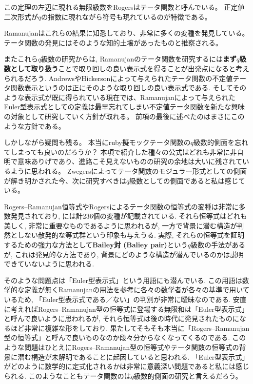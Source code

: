 \documentclass[11pt,b5paper,oneside,lualatex]{ltjsarticle} %
\numberwithin{equation}{section} %
\begin{document}
この定理の左辺に現れる無限級数をRogersはテータ関数と呼んでいる。
正定値二次形式が$ q $の指数に現れながら符号も現れているのが特徴である。

Ramanujanはこれらの結果に知悉しており、非常に多くの変種を発見している。
テータ関数の発見にはそのような知的土壌があったものと推察される。

またこれら$ q $級数の研究からは, Ramanujanのテータ関数を研究するには\textbf{まず$ q $級数として取り扱う}ことで取り回しの良い表示式を得ることが出発点になると考えられるだろう. 
AndrewsやHickersonによって与えられたテータ関数の不定値テータ関数表示というのは正にそのような取り回しの良い表示式である. 
そしてそのような表示式が既に得られている現在では、Ramanujanによって与えられたEuler型表示式としての定義は最早忘れてしまい不定値テータ関数を新たな興味の対象として研究していく方針が取れる。
前項の最後に述べたのはまさにこのような方針である。

しかしながら疑問も残る。
本当にruby{擬}{モック}テータ関数の$ q $級数的側面を忘れてしまっても良いのだろうか？
本項で紹介した種々の公式はどれも非常に非自明で意味ありげであり、進路こそ見えないものの研究の余地は大いに残されているように思われる。
Zwegersによってテータ関数のモジュラー形式としての側面が解き明かされた今、次に研究すべきは$ q $級数としての側面であると私は感じている。

\begin{rem}
	Rogers--Ramanujan恒等式やRogersによるテータ関数の恒等式の変種は非常に多数発見されており, \cite[付録A]{魅惑}には計236個の変種が記載されている. 
	それら恒等式はどれも美しく, 非常に重要なものであるように思われるが, 一方で背景に潜む構造が判然としない散発的な等式群という印象も与えうる. 
	実際, それらの恒等式を証明するための強力な方法として\textbf{Bailey対 (Baliey pair)}という$ q $級数の手法があるが, これは発見的な方法であり, 背景にどのような構造が潜んでいるのかは説明できていないように思われる. 
	
	そのような問題点は「Euler型表示式」という用語にも潜んでいる. 
	この用語は数学的な定義が無くRamanujanの用法を参考に各々の数学者が各々の基準で用いているため, 「Euler型表示式である／ない」の判別が非常に曖昧なのである. 
	安直に考えればRogers--Ramanujan型の恒等式に登場する無限和は「Euler型表示式」と呼んで良いように思われるが, それら恒等式は後の時代に発見されたものになるほど非常に複雑な形をしており, 果たしてそもそも本当に「Rogers--Ramanujan型の恒等式」と呼んで良いものなのか段々分からなくなってくるのである. 
	このような問題はひとえにRogers--Ramanujan型の恒等式やテータ関数の恒等式の背景に潜む構造が未解明であることに起因していると思われる. 
	「Euler型表示式」がどのように数学的に定式化されるかは非常に意義深い問題であると私には感じられる. 
	このようなこともテータ関数のは$ q $級数的側面の研究と言えるだろう。
\end{rem}
\end{document}
